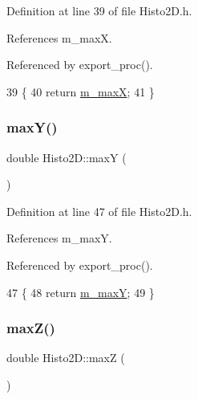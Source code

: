 Definition at line 39 of file Histo2\+D.\+h.



References m\+\_\+maxX.



Referenced by export\+\_\+proc().


\begin{DoxyCode}
39                \{
40     \textcolor{keywordflow}{return} \hyperlink{classHisto2D_af428efc9b984006eeba1a216f7d15d6d}{m\_maxX};
41   \}
\end{DoxyCode}
\mbox{\label{classHisto2D_a7bfc748b81257716316a38e628c5832f}} 
\subsubsection{\texorpdfstring{max\+Y()}{maxY()}}
{\footnotesize\ttfamily double Histo2\+D\+::maxY (\begin{DoxyParamCaption}{ }\end{DoxyParamCaption})\hspace{0.3cm}{\ttfamily [inline]}}



Definition at line 47 of file Histo2\+D.\+h.



References m\+\_\+maxY.



Referenced by export\+\_\+proc().


\begin{DoxyCode}
47                \{
48     \textcolor{keywordflow}{return} \hyperlink{classHisto2D_a049044e82d008636040c5c8815cac297}{m\_maxY};
49   \}
\end{DoxyCode}
\mbox{\label{classHisto2D_ad6ccf8ddd4e4b5930f39284059577570}} 
\subsubsection{\texorpdfstring{max\+Z()}{maxZ()}}
{\footnotesize\ttfamily double Histo2\+D\+::maxZ (\begin{DoxyParamCaption}{ }\end{DoxyParamCaption})\hspace{0.3cm}{\ttfamily [inline]}}



